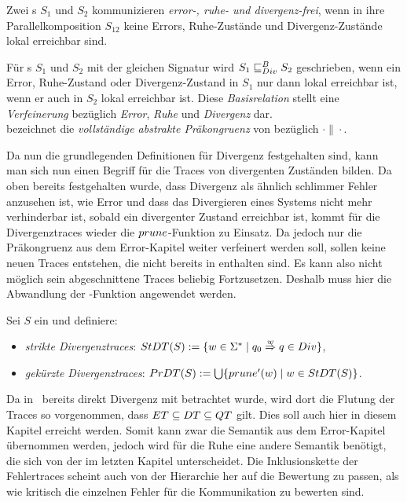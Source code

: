 \begin{Def}
  Zwei \EIO{}s $S_1$ und $S_2$ kommunizieren \emph{error-, ruhe- und
  divergenz-frei}, wenn in ihre Parallelkomposition $S_{12}$ keine Errors,
  Ruhe-Zustände und Divergenz-Zustände lokal erreichbar sind.
\end{Def}

\begin{Def}
\label{DefDivBasisrel}
Für \EIO{}s $S_1$ und $S_2$ mit der gleichen Signatur wird $S_1\sqsubseteq _{Div}^B S_2$
geschrieben, wenn ein Error, Ruhe-Zustand oder Divergenz-Zustand in $S_1$ nur
dann lokal erreichbar ist, wenn er auch in $S_2$ lokal erreichbar ist. Diese
\emph{Basisrelation} stellt eine \emph{Verfeinerung} bezüglich \emph{Error},
\emph{Ruhe} und \emph{Divergenz} dar.\\
\DCRel{} bezeichnet die \emph{vollständige abstrakte Präkongruenz} von \DBRel{}
bezüglich $\cdot\|\cdot$.
\end{Def}

Da nun die grundlegenden Definitionen für Divergenz festgehalten sind,
kann man sich nun einen Begriff für die Traces von divergenten Zuständen
bilden. Da oben bereits festgehalten wurde, dass Divergenz als ähnlich
\glqq{}schlimmer\grqq{} Fehler anzusehen ist, wie Error und dass das Divergieren
eines Systems nicht mehr verhinderbar ist, sobald ein divergenter Zustand
erreichbar ist, kommt für die Divergenztraces wieder die $prune$-Funktion zu
Einsatz. Da jedoch nur die Präkongruenz aus dem Error-Kapitel weiter verfeinert
werden soll, sollen keine neuen Traces entstehen, die nicht bereits in \EL{}
enthalten sind. Es kann also nicht möglich sein abgeschnittene Traces beliebig
Fortzusetzen. Deshalb muss hier die Abwandlung \prunenew{} der
\prune{}-Funktion angewendet werden.

\begin{Def}[Divergenztraces]
  Sei $S$ ein \EIO{} und definiere:
  \begin{itemize}
    \item \emph{strikte Divergenztraces}: $StDT{}(S) := \{w\in\Sigma ^*\mid
      q_0 \overset{w}{\Rightarrow} q\in Div\}$,
    \item \emph{gekürzte Divergenztraces}: $PrDT{}(S) :=
      \bigcup\{prune'{}(w)\mid w\in StDT{}(S)\}$.
  \end{itemize}
\end{Def}

Da in~\cite{Chilton2013} bereits direkt Divergenz mit betrachtet wurde, wird
dort die Flutung der Traces so vorgenommen, dass $ET\subseteq DT\subseteq
QT$ gilt. Dies soll auch hier in diesem Kapitel erreicht werden. Somit kann
zwar die Semantik aus dem Error-Kapitel übernommen werden, jedoch wird für die
Ruhe eine andere Semantik benötigt, die sich von der im letzten Kapitel
unterscheidet. Die Inklusionskette der Fehlertraces scheint auch von der
Hierarchie her auf die Bewertung zu passen, als wie kritisch die einzelnen
Fehler für die Kommunikation zu bewerten sind.

